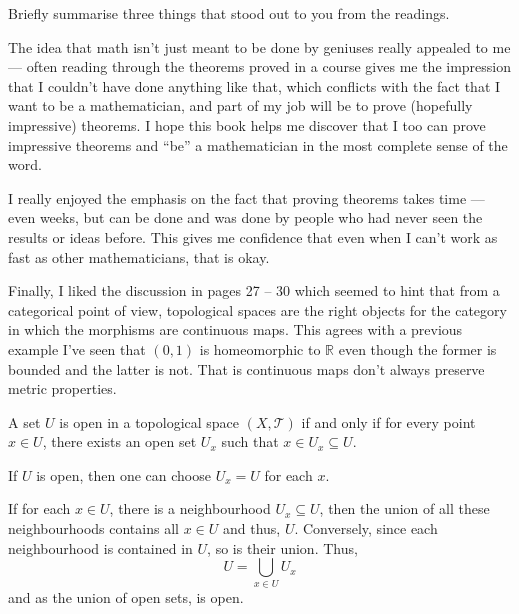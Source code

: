 \documentclass[12 pt, letterpaper]{hmcpset}
\begin{document}
\begin{problem}[A]
	Briefly summarise three things that stood out to you from the readings.
\end{problem}

\begin{solution}
	The idea that math isn't just meant to be done by geniuses really appealed to me --- often reading through the theorems proved in a course gives me the impression that I couldn't have done anything like that, which conflicts with the fact that I want to be a mathematician, and part of my job will be to prove (hopefully impressive) theorems. I hope this book helps me discover that I too can prove impressive theorems and ``be'' a mathematician in the most complete sense of the word.

	I really enjoyed the emphasis on the fact that proving theorems takes time --- even weeks, but can be done and was done by people who had never seen the results or ideas before. This gives me confidence that even when I can't work as fast as other mathematicians, that is okay.

	 Finally, I liked the discussion in pages 27 -- 30 which seemed to hint that from a categorical point of view, topological spaces are the right objects for the category in which the morphisms are continuous maps. This agrees with a previous example I've seen that $(0, 1)$ is homeomorphic to $\mathbb{R}$ even though the former is bounded and the latter is not. That is continuous maps don't always preserve metric properties.


\end{solution}

\pagebreak

\begin{problem}[Theorem 2.3]
	A set $U$ is open in a topological space $(X, \mathcal{T})$ if and only if for every point $x \in U$, there exists an open set $U_{x}$ such that $x \in U_{x} \subseteq U$.
\end{problem}

\begin{solution}
	If $U$ is open, then one can choose $U_{x} = U$ for each $x$.

	If for each $x \in U$, there is a neighbourhood $U_{x} \subseteq U$, then the union of all these neighbourhoods contains all $x \in U$ and thus, $U$. Conversely, since each neighbourhood is contained in $U$, so is their union. Thus,
$$
U = \bigcup_{x \in U} U_{x}
$$
and as the union of open sets, is open.
\end{solution}
\end{document}
